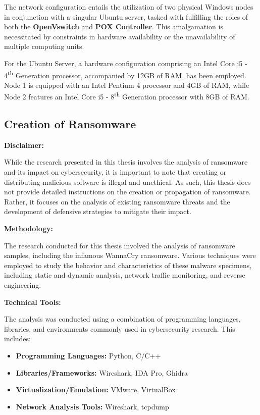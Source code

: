 \documentclass[12pt,letterpaper]{article}
\begin{document}
        The network configuration entails the utilization of two physical Windows nodes in conjunction with a singular Ubuntu server, tasked with fulfilling the roles of both the \textbf{OpenVswitch} and \textbf{POX Controller}. This amalgamation is necessitated by constraints in hardware availability or the unavailability of multiple computing units.

        For the Ubuntu Server, a hardware configuration comprising an Intel Core i5 - 4\textsuperscript{th} Generation processor, accompanied by 12GB of RAM, has been employed. Node 1 is equipped with an Intel Pentium 4 processor and 4GB of RAM, while Node 2 features an Intel Core i5 - 8\textsuperscript{th} Generation processor with 8GB of RAM.


        \subsection{Creation of Ransomware}
        
            \textbf{Disclaimer:}

            While the research presented in this thesis involves the analysis of ransomware and its impact on cybersecurity, it is important to note that creating or distributing malicious software is illegal and unethical. As such, this thesis does not provide detailed instructions on the creation or propagation of ransomware. Rather, it focuses on the analysis of existing ransomware threats and the development of defensive strategies to mitigate their impact.

            \textbf{Methodology:}

            The research conducted for this thesis involved the analysis of ransomware samples, including the infamous WannaCry ransomware. Various techniques were employed to study the behavior and characteristics of these malware specimens, including static and dynamic analysis, network traffic monitoring, and reverse engineering.

            \textbf{Technical Tools:}

            The analysis was conducted using a combination of programming languages, libraries, and environments commonly used in cybersecurity research. This includes:

            \begin{itemize}
                \item \textbf{Programming Languages:} Python, C/C++
                \item \textbf{Libraries/Frameworks:} Wireshark, IDA Pro, Ghidra
                \item \textbf{Virtualization/Emulation:} VMware, VirtualBox
                \item \textbf{Network Analysis Tools:} Wireshark, tcpdump
            \end{itemize}
\end{document}
